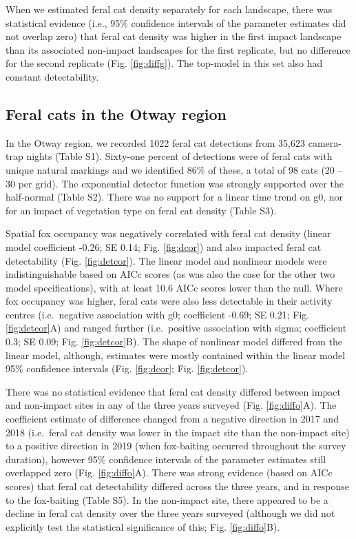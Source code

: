 \documentclass[]{elsarticle} %
\begin{document}
When we estimated feral cat density separately for each landscape, there was statistical evidence (i.e., 95\% confidence intervals of the parameter estimates did not overlap zero) that feral cat density was higher in the first impact landscape than its associated non-impact landscapes for the first replicate, but no difference for the second replicate (Fig. \ref{fig:diffg}). The top-model in this set also had constant detectability.

\hypertarget{feral-cats-in-the-otway-region}{%
\subsection{Feral cats in the Otway region}\label{feral-cats-in-the-otway-region}}

In the Otway region, we recorded 1022 feral cat detections from 35,623 camera-trap nights (Table S1). Sixty-one percent of detections were of feral cats with unique natural markings and we identified 86\% of these, a total of 98 cats (20 -- 30 per grid). The exponential detector function was strongly supported over the half-normal (Table S2). There was no support for a linear time trend on g0, nor for an impact of vegetation type on feral cat density (Table S3).

Spatial fox occupancy was negatively correlated with feral cat density (linear model coefficient -0.26; SE 0.14; Fig. \ref{fig:dcor}) and also impacted feral cat detectability (Fig. \ref{fig:detcor}). The linear model and nonlinear models were indistinguishable based on AICc scores (as was also the case for the other two model specifications), with at least 10.6 AICc scores lower than the null. Where fox occupancy was higher, feral cats were also less detectable in their activity centres (i.e.~negative association with g0; coefficient -0.69; SE 0.21; Fig. \ref{fig:detcor}A) and ranged further (i.e.~positive association with sigma; coefficient 0.3; SE 0.09; Fig. \ref{fig:detcor}B). The shape of nonlinear model differed from the linear model, although, estimates were mostly contained within the linear model 95\% confidence intervals (Fig. \ref{fig:dcor}; Fig. \ref{fig:detcor}).

There was no statistical evidence that feral cat density differed between impact and non-impact sites in any of the three years surveyed (Fig. \ref{fig:diffo}A). The coefficient estimate of difference changed from a negative direction in 2017 and 2018 (i.e.~feral cat density was lower in the impact site than the non-impact site) to a positive direction in 2019 (when fox-baiting occurred throughout the survey duration), however 95\% confidence intervals of the parameter estimates still overlapped zero (Fig. \ref{fig:diffo}A). There was strong evidence (based on AICc scores) that feral cat detectability differed across the three years, and in response to the fox-baiting (Table S5). In the non-impact site, there appeared to be a decline in feral cat density over the three years surveyed (although we did not explicitly test the statistical significance of this; Fig. \ref{fig:diffo}B).
\end{document}
